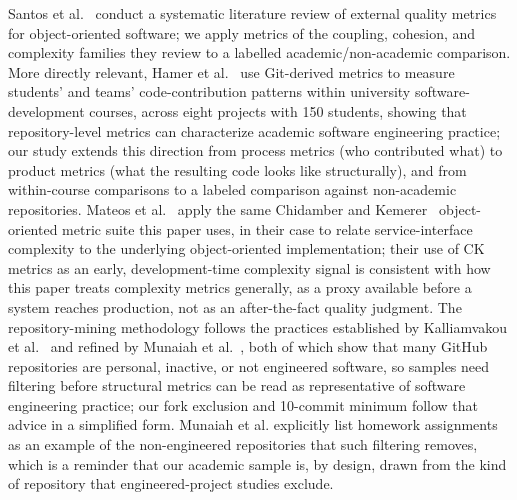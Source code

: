 \documentclass{cleiej}
\providecommand{\citep}[1]{\cite{#1}}
\begin{document}
Santos et al.~\citep{santos2017external} conduct a systematic literature review of external quality metrics for object-oriented software; we apply metrics of the coupling, cohesion, and complexity families they review to a labelled academic/non-academic comparison. More directly relevant, Hamer et al.~\citep{hamer2021using} use Git-derived metrics to measure students' and teams' code-contribution patterns within university software-development courses, across eight projects with 150 students, showing that repository-level metrics can characterize academic software engineering practice; our study extends this direction from process metrics (who contributed what) to product metrics (what the resulting code looks like structurally), and from within-course comparisons to a labeled comparison against non-academic repositories. Mateos et al.~\citep{mateos2017managing} apply the same Chidamber and Kemerer~\citep{chidamber1994metrics} object-oriented metric suite this paper uses, in their case to relate service-interface complexity to the underlying object-oriented implementation; their use of CK metrics as an early, development-time complexity signal is consistent with how this paper treats complexity metrics generally, as a proxy available before a system reaches production, not as an after-the-fact quality judgment. The repository-mining methodology follows the practices established by Kalliamvakou et al.~\citep{kalliamvakou2014promises} and refined by Munaiah et al.~\citep{munaiah2017curating}, both of which show that many GitHub repositories are personal, inactive, or not engineered software, so samples need filtering before structural metrics can be read as representative of software engineering practice; our fork exclusion and 10-commit minimum follow that advice in a simplified form. Munaiah et al. explicitly list homework assignments as an example of the non-engineered repositories that such filtering removes, which is a reminder that our academic sample is, by design, drawn from the kind of repository that engineered-project studies exclude.
\end{document}
